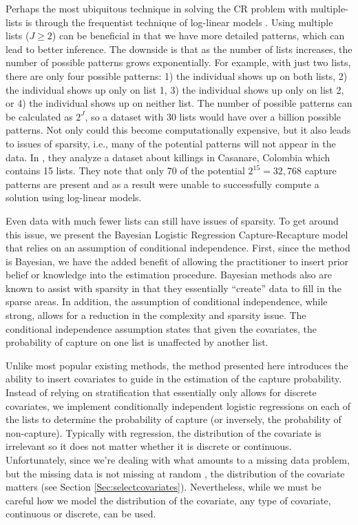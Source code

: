 \documentclass[
  12pt,
]{article}
\begin{document}
Perhaps the most ubiquitous technique in solving the CR problem with
multiple-lists is through the frequentist technique of log-linear models
\citep{fienberg_multiple_1972}. Using multiple lists (\(J\ge 2\)) can be
beneficial in that we have more detailed patterns, which can lead to
better inference. The downside is that as the number of lists increases,
the number of possible patterns grows exponentially. For example, with
just two lists, there are only four possible patterns: 1) the individual
shows up on both lists, 2) the individual shows up only on list 1, 3)
the individual shows up only on list 2, or 4) the individual shows up on
neither list. The number of possible patterns can be calculated as
\(2^J\), so a dataset with 30 lists would have over a billion possible
patterns. Not only could this become computationally expensive, but it
also leads to issues of sparsity, i.e., many of the potential patterns
will not appear in the data. In \cite{manriquevallier_bayesian_2016},
they analyze a dataset about killings in Casanare, Colombia which
contains 15 lists. They note that only 70 of the potential
\(2^{15}=32,768\) capture patterns are present and as a result were
unable to successfully compute a solution using log-linear models.

Even data with much fewer lists can still have issues of sparsity. To
get around this issue, we present the Bayesian Logistic Regression
Capture-Recapture model that relies on an assumption of conditional
independence. First, since the method is Bayesian, we have the added
benefit of allowing the practitioner to insert prior belief or knowledge
into the estimation procedure. Bayesian methods also are known to assist
with sparsity in that they essentially ``create'' data to fill in the
sparse areas. In addition, the assumption of conditional independence,
while strong, allows for a reduction in the complexity and sparsity
issue. The conditional independence assumption states that given the
covariates, the probability of capture on one list is unaffected by
another list.

Unlike most popular existing methods, the method presented here
introduces the ability to insert covariates to guide in the estimation
of the capture probability. Instead of relying on stratification that
essentially only allows for discrete covariates, we implement
conditionally independent logistic regressions on each of the lists to
determine the probability of capture (or inversely, the probability of
non-capture). Typically with regression, the distribution of the
covariate is irrelevant so it does not matter whether it is discrete or
continuous. Unfortunately, since we're dealing with what amounts to a
missing data problem, but the missing data is not missing at random
\citep{rubin_inference_1976}, the distribution of the covariate matters
(see Section \ref{Sec:selectcovariates}). Nevertheless, while we must be
careful how we model the distribution of the covariate, any type of
covariate, continuous or discrete, can be used.
\end{document}
